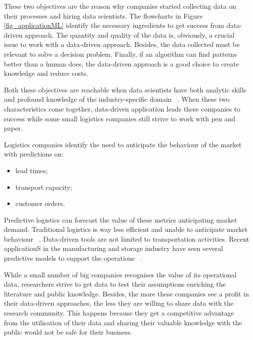 These two objectives are the reason why companies started collecting data on their processes and hiring data scientists. The flowcharts in Figure \ref{fig_applicationML} identify the necessary ingredients to get success from data-driven approach. The quantity and quality of the data is, obviously, a crucial issue to work with a data-driven approach. Besides, the data collected must be relevant to solve a decision problem. Finally, if an algorithm can find patterns better than a human does, the data-driven approach is a good choice to create knowledge and reduce costs.\par

Both these objectives are reachable when data scientists have both analytic skills and profound knowledge of the industry-specific domain ~\cite{Ku2018}. When these two characteristics come together, data-driven application leads these companies to success while some small logistics companies still strive to work with pen and paper.

Logistics companies identify the need to anticipate the behaviour of the market with predictions on:

\begin{itemize}
    \item lead times;
    \item transport capacity;
    \item customer orders. 

\end{itemize}

Predictive logistics can forecast the value of these metrics anticipating market demand. Traditional logistics is way less efficient and unable to anticipate market behaviour ~\cite{LOGISTICAEFFICIENTE2019}. Data-driven tools are not limited to transportation activities.  Recent applicationS in the manufacturing and storage industry have seen several predictive models to support the operations ~\cite{Logisticofthings2017, Package.ai2017, Reporter2016}.\par

While a small number of big companies recognises the value of its operational data, researchers strive to get data to test their assumptions enriching the literature and public knowledge. Besides, the more these companies see a profit in their data-driven approaches, the less they are willing to share data with the research community. This happens because they get a competitive advantage from the utilisation of their data and sharing their valuable knowledge with the public would not be safe for their business.\par


